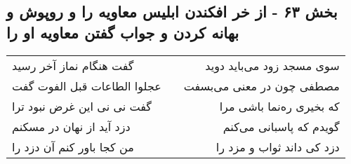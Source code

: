 \begin{center}
\section*{بخش ۶۳ - از خر افکندن ابلیس معاویه را و روپوش و بهانه کردن و جواب گفتن معاویه او را}
\label{sec:sh063}
\begin{longtable}{l p{0.5cm} r}
گفت هنگام نماز آخر رسید
&&
سوی مسجد زود می‌باید دوید
\\
عجلوا الطاعات قبل الفوت گفت
&&
مصطفی چون در معنی می‌بسفت
\\
گفت نی نی این غرض نبود ترا
&&
که بخیری ره‌نما باشی مرا
\\
دزد آید از نهان در مسکنم
&&
گویدم که پاسبانی می‌کنم
\\
من کجا باور کنم آن دزد را
&&
دزد کی داند ثواب و مزد را
\\
\end{longtable}
\end{center}
